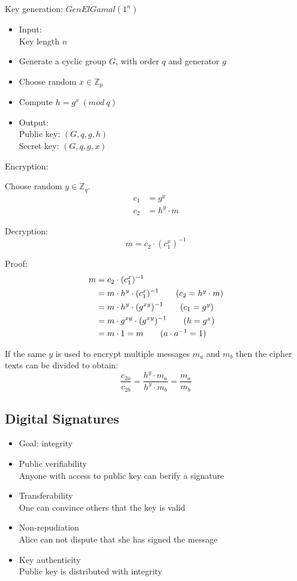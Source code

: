 \documentclass[a4paper]{article}
\begin{document}
Key generation: $GenElGamal(1^{n})$
\begin{itemize}
  \item
    Input: \\
    Key length $n$
  \item Generate a cyclic group $G$, with order $q$ and generator $g$
  \item Choose random $x \in \mathbb{Z}_{p}$
  \item Compute $h = g^{x} \: (mod \: q)$
  \item
    Output: \\
    Public key: $(G, q, g, h)$ \\
    Secret key: $(G, q, g, x)$
\end{itemize}

Encryption:

Choose random $y \in \mathbb{Z}_{q}$.
\begin{align*}
  c_{1} &= g^{y} \\
  c_{2} &= h^{y} \cdot m
\end{align*}

Decryption:
\[
  m = c_{2} \cdot (c_{1}^{x})^{-1}
\]

Proof:
\begin{align*}
  m &= c_{2} \cdot (c_{1}^{x})^{-1} \\
    &= m \cdot h^{y} \cdot (c_{1}^{x})^{-1}   \tag*{($c_{2} = h^{y} \cdot m$)} \\
    &= m \cdot h^{y} \cdot (g^{xy})^{-1}      \tag*{($c_{1} = g^{y})$} \\
    &= m \cdot g^{xy} \cdot (g^{xy})^{-1}     \tag*{($h = g^{x}$)} \\
    &= m \cdot 1 = m                          \tag*{($a \cdot a^{-1} = 1$)}
\end{align*}


If the same $y$ is used to encrypt multiple messages $m_{a}$ and $m_{b}$ then
the cipher texts can be divided to obtain:
\[
  \frac{c_{2a}}{c_{2b}} = \frac{h^{y} \cdot m_{a}}{h^{y} \cdot m_{b}}
                        = \frac{m_{a}}{m_{b}}
\]

\subsection{Digital Signatures}

\begin{itemize}
  \item Goal: integrity
  \item
    Public verifiability \\
    Anyone with access to public key can berify a signature
  \item
    Transferability \\
    One can convince others that the key is valid
  \item
    Non-repudiation \\
    Alice can not dispute that she has signed the message
  \item
    Key authenticity \\
    Public key is distributed with integrity
\end{itemize}
\end{document}
